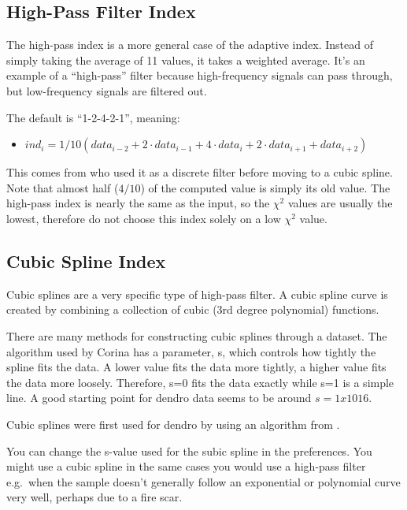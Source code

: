 \subsection{High-Pass Filter Index}
The high-pass index is a more general case of the adaptive index. Instead of simply taking the average of 11 values, it takes a weighted average. It's an example of a ``high-pass'' filter because high-frequency signals can pass through, but low-frequency signals are filtered out.

The default is ``1-2-4-2-1'', meaning:

\begin{itemize}
\item $ind_{i} = 1/10 (data_{i-2} + 2{\cdotp}data_{i-1} + 4{\cdotp}data_{i} +2{\cdotp}data_{i+1} + data_{i+2})$ 
\end{itemize}

This comes from \citet{Cook81} who used it as a discrete filter before moving to a cubic spline. Note that almost half ($4/10$) of the computed value is simply its old value. The high-pass index is nearly the same as the input, so the $\chi^2$ values are usually the lowest, therefore do not choose this index solely on a low $\chi^2$ value. 

\subsection{Cubic Spline Index}
Cubic splines are a very specific type of high-pass filter. A cubic spline curve is created by combining a collection of cubic (3rd degree polynomial) functions.

There are many methods for constructing cubic splines through a dataset. The algorithm used by Corina has a parameter, s, which controls how tightly the spline fits the data. A lower value fits the data more tightly, a higher value fits the data more loosely. Therefore, s=0 fits the data exactly while s=1 is a simple line. A good starting point for dendro data seems to be around $s=1x1016$.

Cubic splines were first used for dendro by \citet{Cook81} using an algorithm from \citet{Reinsch67}.

You can change the s-value used for the subic spline in the preferences. You might use a cubic spline in the same cases you would use a high-pass filter e.g.\ when the sample doesn't generally follow an exponential or polynomial curve very well, perhaps due to a fire scar. 

